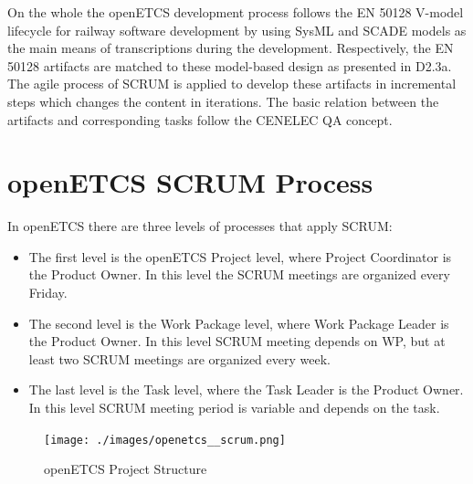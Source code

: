 On the whole the openETCS development process follows the EN 50128 V-model lifecycle for railway software development by using SysML and SCADE models as the main means of transcriptions during the development. Respectively, the EN 50128 artifacts are matched to these model-based design as presented in D2.3a. The agile process of SCRUM is applied to develop these artifacts in incremental steps which changes the content in iterations. The basic relation between the artifacts and corresponding tasks follow the CENELEC QA concept.


\chapter{openETCS SCRUM Process}
\label{sec:ScrumProzess}

In openETCS there are three levels of processes that apply SCRUM:
\begin{itemize}
	\item The first level is the openETCS Project level, where Project Coordinator is the Product Owner. In this level the SCRUM meetings are organized every Friday.
	\item The second level is the Work Package level, where Work Package Leader is the Product Owner. In this level SCRUM meeting depends on WP, but at least two SCRUM meetings are organized every week.
	\item The last level is the Task level, where the Task Leader is the Product Owner. In this level SCRUM meeting period is variable and depends on the task.
\end{itemize}

\begin{figure}[h]
	\centering
	\texttt{[image: ./images/openetcs\_\_scrum.png]}
	\caption{openETCS Project Structure}
\end{figure}

